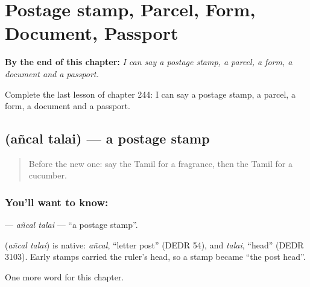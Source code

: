 
\chapter{Postage stamp, Parcel, Form, Document, Passport}
\label{ch:ta-postage-stamp-parcel-form-document-passport}

\begin{chapteropening}
\textbf{By the end of this chapter:} \emph{I can say a postage stamp, a parcel, a form, a document and a passport.}

Complete the last lesson of chapter 244: I can say a postage stamp, a parcel, a form, a document and a passport.
\end{chapteropening}

\section[\texorpdfstring{\ta{அஞ்சல்} \ta{தலை} (añcal talai)}{அஞ்சல் தலை (añcal talai)}]{  (añcal talai) — a postage stamp}

\label{lesson:TA-C244-ancal-talai}



\begin{quote}
Before the new one: say the Tamil for a fragrance, then the Tamil for a cucumber.
\end{quote}

\subsection*{You'll want to know:  }
\textbf{ } — \emph{añcal talai} — \textquotedblleft{}a postage stamp\textquotedblright{}.

\begin{cousinweb}
\textbf{ } (\emph{añcal talai}) is native: \emph{añcal}, \textquotedblleft{}letter post\textquotedblright{} (DEDR 54), and \emph{talai}, \textquotedblleft{}head\textquotedblright{} (DEDR 3103). Early stamps carried the ruler's head, so a stamp became \textquotedblleft{}the post head\textquotedblright{}.
\end{cousinweb}

\begin{grammarlens}[title={What you've built}]
One more word for this chapter.
\end{grammarlens}

